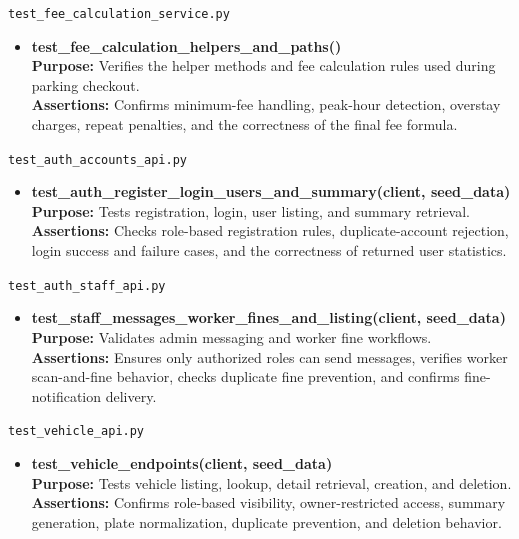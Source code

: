 \documentclass[12pt,a4paper,oneside]{report}
\begin{document}
\texttt{test\_fee\_calculation\_service.py}
\begin{itemize}[leftmargin=2em]
    \item \textbf{test\_fee\_calculation\_helpers\_and\_paths()} \\
    \textbf{Purpose:} Verifies the helper methods and fee calculation rules used during parking checkout. \\
    \textbf{Assertions:} Confirms minimum-fee handling, peak-hour detection, overstay charges, repeat penalties, and the correctness of the final fee formula.
\end{itemize}

\texttt{test\_auth\_accounts\_api.py}
\begin{itemize}[leftmargin=2em]
    \item \textbf{test\_auth\_register\_login\_users\_and\_summary(client, seed\_data)} \\
    \textbf{Purpose:} Tests registration, login, user listing, and summary retrieval. \\
    \textbf{Assertions:} Checks role-based registration rules, duplicate-account rejection, login success and failure cases, and the correctness of returned user statistics.
\end{itemize}

\texttt{test\_auth\_staff\_api.py}
\begin{itemize}[leftmargin=2em]
    \item \textbf{test\_staff\_messages\_worker\_fines\_and\_listing(client, seed\_data)} \\
    \textbf{Purpose:} Validates admin messaging and worker fine workflows. \\
    \textbf{Assertions:} Ensures only authorized roles can send messages, verifies worker scan-and-fine behavior, checks duplicate fine prevention, and confirms fine-notification delivery.
\end{itemize}

\texttt{test\_vehicle\_api.py}
\begin{itemize}[leftmargin=2em]
    \item \textbf{test\_vehicle\_endpoints(client, seed\_data)} \\
    \textbf{Purpose:} Tests vehicle listing, lookup, detail retrieval, creation, and deletion. \\
    \textbf{Assertions:} Confirms role-based visibility, owner-restricted access, summary generation, plate normalization, duplicate prevention, and deletion behavior.
\end{itemize}
\end{document}

